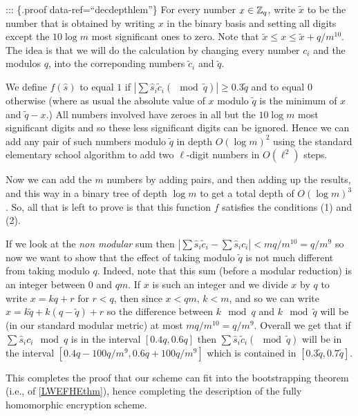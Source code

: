 ::: \{.proof data-ref=``decdepthlem''\} For every number \(x\in{\mathbb{Z}}_q\),
write \(\tilde{x}\) to be the number that is obtained by writing \(x\)
in the binary basis and setting all digits except the \(10\log m\) most
significant ones to zero. Note that
\(\tilde{x} \leq x \leq \tilde{x} + q/m^{10}\). The idea is that we will
do the calculation by changing every number \(c_i\) and the modulos
\(q\), into the correponding numbers \(\tilde{c}_i\) and \(\tilde{q}\).

We define \(f(\hat{s})\) to equal \(1\) if
\(|\sum \hat{s}_i \tilde{c}_i (\mod \tilde{q})| \geq 0.3\tilde{q}\) and
to equal \(0\) otherwise (where as usual the absolute value of \(x\)
modulo \(\tilde{q}\) is the minimum of \(x\) and \(\tilde{q}-x\).) All
numbers involved have zeroes in all but the \(10\log m\) most
significant digits and so these less significant digits can be ignored.
Hence we can add any pair of such numbers modulo \(\tilde{q}\) in depth
\(O(\log m)^2\) using the standard elementary school algorithm to add
two \(\ell\)-digit numbers in \(O(\ell^2)\) steps.

Now we can add the \(m\) numbers by adding pairs, and then adding up the
results, and this way in a binary tree of depth \(\log m\) to get a
total depth of \(O(\log m)^3\). So, all that is left to prove is that
this function \(f\) satisfies the conditions (1) and (2).

If we look at the \emph{non modular} sum then
\(|\sum \hat{s}_i \tilde{c}_i - \sum \hat{s}_i c_i | < mq/m^{10} = q/m^9\)
so now we want to show that the effect of taking modulo \(\tilde{q}\) is
not much different from taking modulo \(q\). Indeed, note that this sum
(before a modular reduction) is an integer between \(0\) and \(qm\). If
\(x\) is such an integer and we divide \(x\) by \(q\) to write
\(x = kq+ r\) for \(r<q\), then since \(x<qm\), \(k<m\), and so we can
write \(x = k\tilde{q} + k(q-\tilde{q})+r\) so the difference between
\(k \mod q\) and \(k \mod{\tilde{q}}\) will be (in our standard modular
metric) at most \(mq/m^{10}=q/m^9\). Overall we get that if
\(\sum \hat{s}_i c_i \mod{q}\) is in the interval \([0.4q, 0.6q]\) then
\(\sum \hat{s}_i \tilde{c}_i ( \mod{\tilde{q}})\) will be in the
interval \([0.4q-100q/m^9, 0.6q+100q/m^9]\) which is contained in
\([0.3\tilde{q},0.7\tilde{q}]\).

This completes the proof that our scheme can fit into the bootstrapping
theorem (i.e., of \cref{LWEFHEthm}), hence completing the description of
the fully homomorphic encryption scheme.

